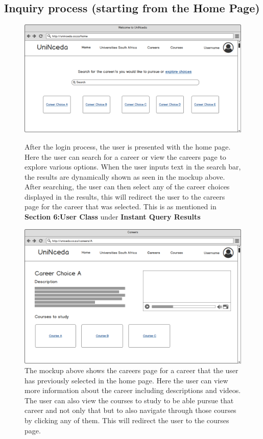 \documentclass[a4paper, 12pt]{article}
\begin{document}
\subsection{Inquiry process (starting from the Home Page)}

\setcounter{figure}{0}

\begin{figure}[H]
\centering
\includegraphics[scale=0.5]{HomePage}
\caption{\small After the login process, the user is presented with the home page. Here the user can search for a career or view the careers page to explore various options. When the user inputs text in the search bar, the results are dynamically shown as seen in the mockup above. After searching, the user can then select any of the career choices displayed in the results, this will redirect the user to the careers page for the career that was selected. This is as mentioned in \textbf{Section 6:User Class} under \textbf{Instant Query Results}}
\label{HomePage}

\vspace{1cm}

\includegraphics[scale=0.3]{Careers}
\caption{\small The mockup above shows the careers page for a career that the user has previously selected in the home page. Here the user can view more information about the career including descriptions and videos. The user can also view the courses to study to be able pursue that career and not only that but to also navigate through those courses by clicking any of them. This will redirect the user to the courses page.}
\label{Careers}
\end{figure}
\end{document}
